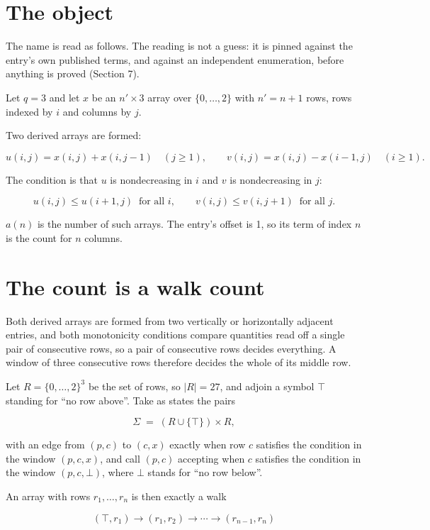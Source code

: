 \documentclass[11pt]{article}
\theoremstyle{definition}
\begin{document}
\section{The object}

The name is read as follows. The reading is not a guess: it is pinned against the entry's own published terms, and against an independent enumeration, before anything is proved (Section 7).

Let $q = 3$ and let $x$ be an $n' \times 3$ array over $\{0,\dots,2\}$ with $n' = n + 1$ rows, rows indexed by $i$ and columns by $j$.

Two derived arrays are formed:

\[u(i,j) = x(i,j) + x(i,j{-}1)\quad (j \ge 1), \qquad v(i,j) = x(i,j) - x(i{-}1,j)\quad (i \ge 1).\]

The condition is that $u$ is nondecreasing in $i$ and $v$ is nondecreasing in $j$:

\[u(i,j) \le u(i{+}1,j) \ \text{ for all } i, \qquad v(i,j) \le v(i,j{+}1) \ \text{ for all } j.\]

$a(n)$ is the number of such arrays. The entry's offset is 1, so its term of index $n$ is the count for $n$ columns.

\section{The count is a walk count}

Both derived arrays are formed from two vertically or horizontally adjacent entries, and both monotonicity conditions compare quantities read off a single pair of consecutive rows, so a pair of consecutive rows decides everything. A window of three consecutive rows therefore decides the whole of its middle row.

Let $R = \{0,\dots,2\}^{3}$ be the set of rows, so $|R| = 27$, and adjoin a symbol $\top$ standing for ``no row above''. Take as states the pairs

\[\Sigma \;=\; (R \cup \{\top\}) \times R,\]

with an edge from $(p,c)$ to $(c,x)$ exactly when row $c$ satisfies the condition in the window $(p,c,x)$, and call $(p,c)$ accepting when $c$ satisfies the condition in the window $(p,c,\bot)$, where $\bot$ stands for ``no row below''.

An array with rows $r_1,\dots,r_n$ is then exactly a walk

\[(\top,r_1) \to (r_1,r_2) \to \cdots \to (r_{n-1},r_n)\]
\end{document}
